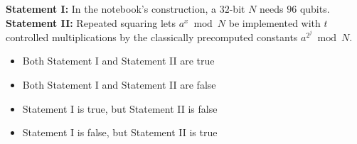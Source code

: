 \documentclass[11pt,a4paper]{article}
\newcommand{\optlabel}[1]{\textbf{(#1)}}
\newenvironment{qitem}[1]{\begin{list}{}{\setlength{\leftmargin}{3.3em}\setlength{\labelwidth}{3.1em}%
  \setlength{\labelsep}{0.2em}\setlength{\topsep}{3pt}\setlength{\parsep}{3pt}}\item[\textbf{Q.#1}\hfill]}{\end{list}}
\newcommand{\qsep}{\par\vspace{2pt}{\color{black!15}\hrule}\vspace{4pt}}
\begin{document}
\begin{qitem}{78}
\textbf{Statement I:} In the notebook's construction, a $32$-bit $N$ needs $96$ qubits.\\[1mm]
\textbf{Statement II:} Repeated squaring lets $a^x \bmod N$ be implemented with $t$ controlled multiplications by the classically precomputed constants $a^{2^j} \bmod N$.
\begin{itemize}[leftmargin=2.6em, labelsep=0.4em, itemsep=2pt, topsep=3pt]
\item[\optlabel{A}] Both Statement I and Statement II are true
\item[\optlabel{B}] Both Statement I and Statement II are false
\item[\optlabel{C}] Statement I is true, but Statement II is false
\item[\optlabel{D}] Statement I is false, but Statement II is true
\end{itemize}
\end{qitem}
\qsep
\end{document}
